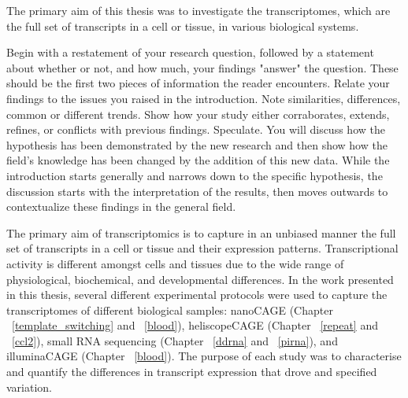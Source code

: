 The primary aim of this thesis was to investigate the transcriptomes, which are the full set of transcripts in a cell or tissue, in various biological systems.

Begin with a restatement of your research question, followed by a statement about whether or not, and how much, your findings "answer" the question.  These should be the first two pieces of information the reader encounters. Relate your findings to the issues you raised in the introduction. Note similarities, differences, common or different trends.  Show how your study either corraborates, extends, refines, or conflicts with previous findings. Speculate. You will discuss how the hypothesis has been demonstrated by the new research and then show how the field's knowledge has been changed by the addition of this new data. While the introduction starts generally and narrows down to the specific hypothesis, the discussion starts with the interpretation of the results, then moves outwards to contextualize these findings in the general field.

The primary aim of transcriptomics is to capture in an unbiased manner the full set of transcripts in a cell or tissue and their expression patterns\cite{pmid19015660}. Transcriptional activity is different amongst cells and tissues due to the wide range of physiological, biochemical, and developmental differences. In the work presented in this thesis, several different experimental protocols were used to capture the transcriptomes of different biological samples: nanoCAGE\cite{pmid20543846} (Chapter ~\ref{template_switching} and ~\ref{blood}), heliscopeCAGE\cite{pmid21596820} (Chapter ~\ref{repeat} and ~\ref{ccl2}), small RNA sequencing\cite{pmid20964636} (Chapter ~\ref{ddrna} and ~\ref{pirna}), and illuminaCAGE\cite{Takahashi2012} (Chapter ~\ref{blood}). The purpose of each study was to characterise and quantify the differences in transcript expression that drove and specified variation.


